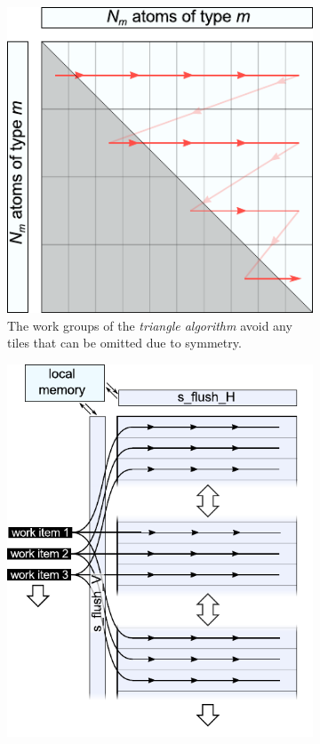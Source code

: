 \documentclass[11pt,twoside]{report}
\begin{document}
\begin{figure}[htbp]
\begin{subfigure}{0.42\textwidth}
	  \includegraphics[width=\textwidth]{img/kernel_wg_tri.pdf}
	  \caption{The work groups of the {\it triangle algorithm} avoid any tiles that can be omitted due to symmetry.}
	  \label{fig:kernel_wg_tri}	
	\end{subfigure}
	\vspace{5mm}
	\begin{subfigure}{0.47\textwidth}
	  \includegraphics[width=\textwidth]{img/kernel_tile.pdf}

\end{subfigure}
\end{figure}
\end{document}
